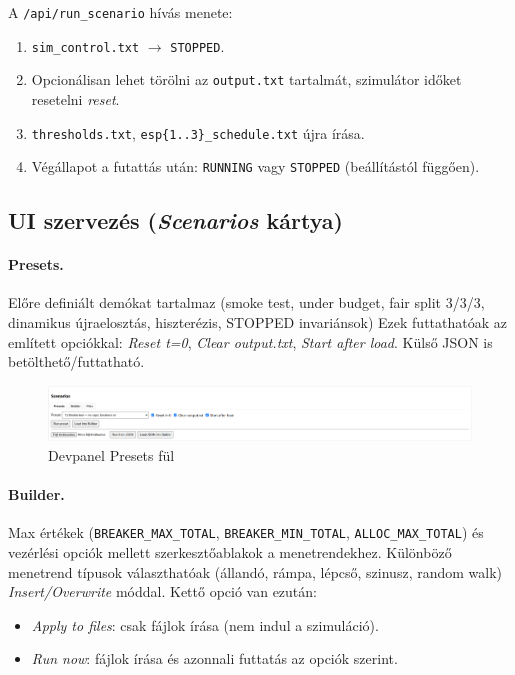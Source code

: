 A \verb|/api/run_scenario| hívás menete:
\begin{enumerate}
  \item \texttt{sim\_control.txt} \(\rightarrow\) \texttt{STOPPED}.
  \item Opcionálisan lehet törölni az \texttt{output.txt} tartalmát, szimulátor időket resetelni \emph{reset}.
  \item \texttt{thresholds.txt}, \texttt{esp\{1..3\}\_schedule.txt} újra írása.
  \item Végállapot a futattás után: \texttt{RUNNING} vagy \texttt{STOPPED} (beállítástól függően).
\end{enumerate}

\subsection{UI szervezés (\emph{Scenarios} kártya)}
\paragraph{Presets.} Előre definiált demókat tartalmaz (smoke test, under budget, fair split 3/3/3, 
dinamikus újraelosztás, hiszterézis, STOPPED invariánsok) Ezek futtathatóak az említett opciókkal: 
\emph{Reset t=0}, \emph{Clear output.txt}, \emph{Start after load}. Külső JSON is betölthető/futtatható.

\begin{figure}[H]
    \centering
    \includegraphics[width=1\textwidth]{figures/devpanel presets.png}
    \caption{Devpanel Presets fül}
    \label{fig:devpanel presets}
\end{figure}

\paragraph{Builder.} Max értékek (\texttt{BREAKER\_MAX\_TOTAL}, \texttt{BREAKER\_MIN\_TOTAL}, 
\texttt{ALLOC\_MAX\_TOTAL}) és vezérlési opciók mellett szerkesztőablakok a
menetrendekhez. Különböző menetrend típusok választhatóak 
(állandó, rámpa, lépcső, szinusz, random walk) \emph{Insert/Overwrite} móddal.
Kettő opció van ezután:
\begin{itemize}
  \item \emph{Apply to files}: csak fájlok írása (nem indul a szimuláció).
  \item \emph{Run now}: fájlok írása és azonnali futtatás az opciók szerint.
\end{itemize}

